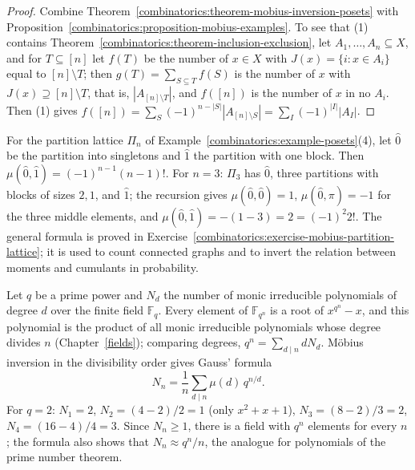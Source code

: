 \begin{proof}
Combine Theorem~\ref{combinatorics:theorem-mobius-inversion-posets} with Proposition~\ref{combinatorics:proposition-mobius-examples}. To see that (1) contains Theorem~\ref{combinatorics:theorem-inclusion-exclusion},
let $A_1, \ldots, A_n \subseteq X$, and for $T \subseteq [n]$ let $f(T)$ be the number of $x \in X$ with $J(x) = \{i : x \in A_i\}$ equal to $[n] \setminus T$; then $g(T) = \sum_{S \subseteq T}f(S)$ is
the number of $x$ with $J(x) \supseteq [n] \setminus T$, that is, $|A_{[n] \setminus T}|$, and $f([n])$ is the number of $x$ in no $A_i$. Then (1) gives
$f([n]) = \sum_{S}(-1)^{n - |S|}|A_{[n] \setminus S}| = \sum_{I}(-1)^{|I|}|A_I|$.
\end{proof}

\begin{example}\label{combinatorics:example-mobius-partitions}
For the partition lattice $\Pi_n$ of Example~\ref{combinatorics:example-posets}(4), let $\hat{0}$ be the partition into singletons and $\hat{1}$ the partition with one block. Then
$\mu(\hat{0}, \hat{1}) = (-1)^{n-1}(n - 1)!$. For $n = 3$: $\Pi_3$ has $\hat{0}$, three partitions with blocks of sizes $2, 1$, and $\hat{1}$; the recursion gives $\mu(\hat{0}, \hat{0}) = 1$,
$\mu(\hat{0}, \pi) = -1$ for the three middle elements, and $\mu(\hat{0}, \hat{1}) = -(1 - 3) = 2 = (-1)^2 2!$. The general formula is proved in Exercise~\ref{combinatorics:exercise-mobius-partition-lattice};
it is used to count connected graphs and to invert the relation between moments and cumulants in probability.
\end{example}

\begin{example}\label{combinatorics:example-irreducible-polynomials}
Let $q$ be a prime power and $N_d$ the number of monic irreducible polynomials of degree $d$ over the finite field $\mathbb{F}_q$. Every element of $\mathbb{F}_{q^n}$ is a root of $x^{q^n} - x$, and this
polynomial is the product of all monic irreducible polynomials whose degree divides $n$ (Chapter~\ref{fields}); comparing degrees, $q^n = \sum_{d \mid n}dN_d$. M\"obius inversion in the divisibility order
gives Gauss' formula
\[
N_n = \frac{1}{n}\sum_{d \mid n}\mu(d)\,q^{n/d}.
\]
For $q = 2$: $N_1 = 2$, $N_2 = (4 - 2)/2 = 1$ (only $x^2 + x + 1$), $N_3 = (8 - 2)/3 = 2$, $N_4 = (16 - 4)/4 = 3$. Since $N_n \geq 1$, there is a field with $q^n$ elements for every $n$; the formula also
shows that $N_n \approx q^n/n$, the analogue for polynomials of the prime number theorem.
\end{example}

